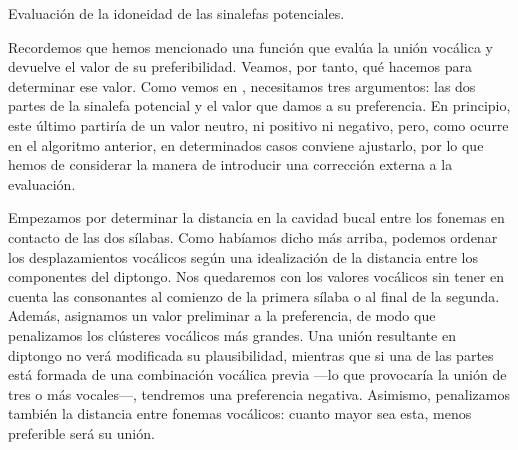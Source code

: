 \begin{algorithm}[!ht]
	\caption{Evaluación de la idoneidad de las sinalefas potenciales.}\label{list:VerSeMetre5}
\end{algorithm}

Recordemos que hemos mencionado una función que evalúa la unión vocálica y devuelve el valor de su preferibilidad. Veamos, por tanto, qué hacemos para determinar ese valor. Como vemos en , necesitamos tres argumentos: las dos partes de la sinalefa potencial y el valor que damos a su preferencia. En principio, este último partiría de un valor neutro, ni positivo ni negativo, pero, como ocurre en el algoritmo anterior, en determinados casos conviene ajustarlo, por lo que hemos de considerar la manera de introducir una corrección externa a la evaluación.

Empezamos por determinar la distancia en la cavidad bucal entre los fonemas en contacto de las dos sílabas. Como habíamos dicho más arriba, podemos ordenar los desplazamientos vocálicos según una idealización de la distancia entre los componentes del diptongo. Nos quedaremos con los valores vocálicos sin tener en cuenta las consonantes al comienzo de la primera sílaba o al final de la segunda. Además, asignamos un valor preliminar a la preferencia, de modo que penalizamos los clústeres vocálicos más grandes. Una unión resultante en diptongo no verá modificada su plausibilidad, mientras que si una de las partes está formada de una combinación vocálica previa —lo que provocaría la unión de tres o más vocales—, tendremos una preferencia negativa. Asimismo, penalizamos también la distancia entre fonemas vocálicos: cuanto mayor sea esta, menos preferible será su unión.

